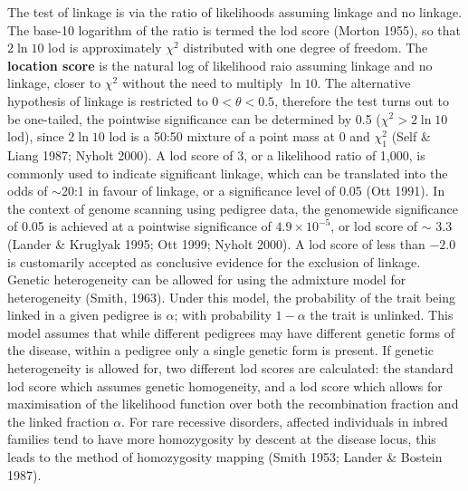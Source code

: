 The test of linkage is via the ratio of likelihoods assuming linkage and no
linkage.  The base-10 logarithm of the ratio is termed the lod score (Morton
1955), so that $2\ln 10$ lod is approximately $\chi^2$ distributed with one
degree of freedom.  The {\bf location score} is the natural log of likelihood
raio assuming linkage and no linkage, closer to $\chi^2$ without the need to
multiply $\ln 10$.  The alternative hypothesis of linkage is restricted to
$0<\theta<0.5$, therefore the test turns out to be one-tailed, the pointwise
significance can be determined by 0.5 ($\chi^2>2\ln10$ lod), since $2\ln 10$
lod is a 50:50 mixture of a point mass at 0 and $\chi_1^2$ (Self \& Liang 1987;
Nyholt 2000).  A lod score of 3, or a likelihood ratio of 1,000, is commonly
used to indicate significant linkage, which can be translated into the odds of
$\sim$20:1 in favour of linkage, or a significance level of 0.05 (Ott 1991).
In the context of genome scanning using pedigree data, the genomewide
significance of 0.05 is achieved at a pointwise significance of $4.9\times
10^{-5}$, or lod score of $\sim$ 3.3 (Lander \& Kruglyak 1995; Ott 1999; Nyholt
2000).  A lod score of less than $-2.0$ is customarily accepted as conclusive
evidence for the exclusion of linkage.  Genetic heterogeneity can be allowed
for using the admixture model for heterogeneity (Smith, 1963).  Under this
model, the probability of the trait being linked in a given pedigree is
$\alpha$; with probability $1 - \alpha$ the trait is unlinked.  This model
assumes that while different pedigrees may have different genetic forms of the
disease, within a pedigree only a single genetic form is present.  If genetic
heterogeneity is allowed for, two different lod scores are calculated:  the
standard lod score which assumes genetic homogeneity, and a lod score which
allows for maximisation of the likelihood function over both the recombination
fraction and the linked fraction $\alpha$.  For rare recessive disorders,
affected individuals in inbred families tend to have more homozygosity by
descent at the disease locus, this leads to the method of homozygosity mapping
(Smith 1953; Lander \& Bostein 1987).

